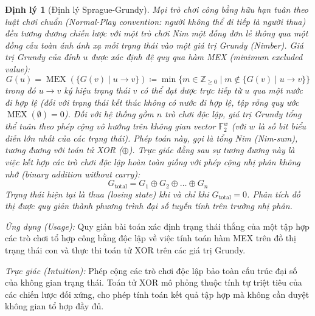 \documentclass{article}
\newtheorem{dinhly}{Định lý}
\begin{document}
\begin{dinhly}[Định lý Sprague-Grundy]
Mọi trò chơi công bằng hữu hạn tuân theo luật chơi chuẩn (Normal-Play convention: người không thể đi tiếp là người thua) đều tương đương chiến lược với một trò chơi Nim một đống đơn lẻ thông qua một đồng cấu toàn ánh ánh xạ mỗi trạng thái vào một giá trị Grundy (Nimber). 
Giá trị Grundy của đỉnh $u$ được xác định đệ quy qua hàm MEX (minimum excluded value):
\begin{equation*}
 G(u) = \operatorname{MEX}(\{G(v) \mid u \to v\}) \coloneqq \min \{ m \in \mathbb{Z}_{\ge 0} \mid m \notin \{G(v) \mid u \to v\} \}
\end{equation*}
trong đó $u \to v$ ký hiệu trạng thái $v$ có thể đạt được trực tiếp từ $u$ qua một nước đi hợp lệ (đối với trạng thái kết thúc không có nước đi hợp lệ, tập rỗng quy ước $\operatorname{MEX}(\emptyset) = 0$).
Đối với hệ thống gồm $n$ trò chơi độc lập, giá trị Grundy tổng thể tuân theo phép cộng vô hướng trên không gian vector $\mathbb{F}_2^w$ (với $w$ là số bit biểu diễn lớn nhất của các trạng thái). Phép toán này, gọi là tổng Nim (Nim-sum), tương đương với toán tử XOR ($\oplus$). Trực giác đằng sau sự tương đương này là việc kết hợp các trò chơi độc lập hoàn toàn giống với phép cộng nhị phân không nhớ (binary addition without carry): 
\begin{equation*}
 G_{\text{total}} = G_1 \oplus G_2 \oplus \dots \oplus G_n
\end{equation*}
Trạng thái hiện tại là thua (losing state) khi và chỉ khi $G_{\text{total}} = 0$. Phân tích đồ thị được quy giản thành phương trình đại số tuyến tính trên trường nhị phân.
\end{dinhly}

\emph{Ứng dụng (Usage):} Quy giản bài toán xác định trạng thái thắng của một tập hợp các trò chơi tổ hợp công bằng độc lập về việc tính toán hàm MEX trên đồ thị trạng thái con và thực thi toán tử XOR trên các giá trị Grundy.

\emph{Trực giác (Intuition):} Phép cộng các trò chơi độc lập bảo toàn cấu trúc đại số của không gian trạng thái. Toán tử XOR mô phỏng thuộc tính tự triệt tiêu của các chiến lược đối xứng, cho phép tính toán kết quả tập hợp mà không cần duyệt không gian tổ hợp đầy đủ.
\end{document}
